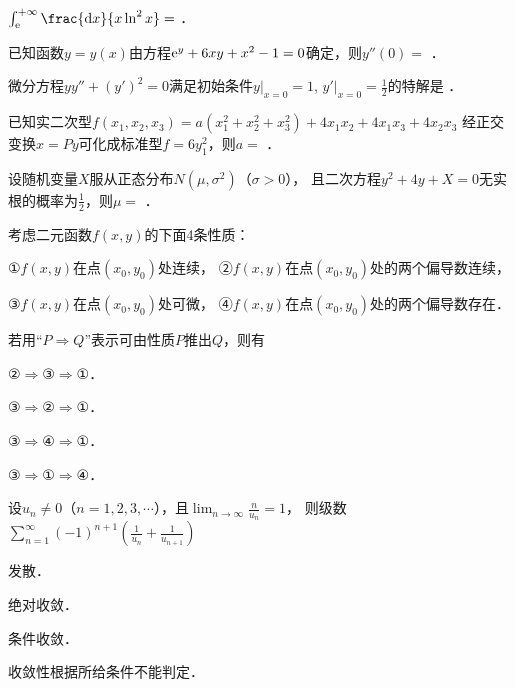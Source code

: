 \documentclass[plain,noanswer,medmath]{../../template/jnuexam}
\begin{document}




\begin{problem}
$\int_{\e}^{+\infty} \frac{\dx}{x\ln^2 x} =$ \fillin{}．
\end{problem}


\begin{problem}
已知函数$y = y(x)$由方程$\mathrm{e}^y + 6xy + x^2 - 1 = 0$确定，则$y''(0) =$ \fillin{}．
\end{problem}


\begin{problem}
微分方程$yy'' + (y')^2 = 0$满足初始条件$y|_{x = 0} = 1$, $y' |_{x = 0} = \frac{1}{2}$的特解是 \fillin{}．
\end{problem}


\begin{problem}
已知实二次型$f(x_1,x_2,x_3) = a(x_1^2 + x_2^2 + x_3^2) + 4x_1x_2 + 4x_1x_3 + 4x_2x_3$
经正交变换$x = Py$可化成标准型$f = 6y_1^2$，则$a =$ \fillin{}．
\end{problem}


\begin{problem}
设随机变量$X$服从正态分布$N(\mu,\sigma^2)$（$\sigma > 0$），
且二次方程$y^2 + 4y + X = 0$无实根的概率为$\frac{1}{2}$，则$\mu =$ \fillin{}．
\end{problem}




\begin{problem}
考虑二元函数$f(x,y)$的下面4条性质：\par
①$f(x,y)$在点$(x_0,y_0)$处连续，	②$f(x,y)$在点$(x_0,y_0)$处的两个偏导数连续，\par
③$f(x,y)$在点$(x_0,y_0)$处可微，	④$f(x,y)$在点$(x_0,y_0)$处的两个偏导数存在．\par
若用``$P \Rightarrow Q$''表示可由性质$P$推出$Q$，则有\pickout{}
\begin{abcd}
\item ②$\Rightarrow$③$\Rightarrow$①．
\item ③$\Rightarrow$②$\Rightarrow$①．
\item ③$\Rightarrow$④$\Rightarrow$①．
\item ③$\Rightarrow$①$\Rightarrow$④．
\end{abcd}
\end{problem}


\begin{problem}
设$u_n \ne 0$（$n = 1,2,3, \cdots$），且$\lim_{n \to \infty} \frac{n}{u_n} = 1$，
则级数$\sum_{n = 1}^{\infty}(- 1)^{n + 1} \left(\frac{1}{u_n} + \frac{1}{u_{n + 1}} \right)$\pickout{}
\begin{abcd}
\item 发散．
\item 绝对收敛．
\item 条件收敛．
\item 收敛性根据所给条件不能判定．
\end{abcd}
\end{problem}
\end{document}

